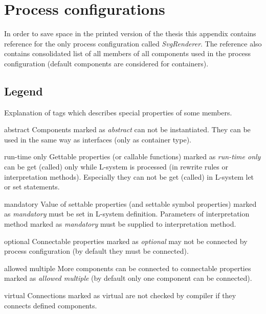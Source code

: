 
\chapter{Process configurations}
\label{chap:configurations}

In order to save space in the printed version of the thesis this appendix contains reference for the only process configuration called \emph{SvgRenderer}.
The reference also contains consolidated list of all members of all components used in the process configuration (default components are considered for containers).

\section{Legend}

Explanation of tags which describes special properties of some members.

\begin{description*}
	\item[abstract]
		Components marked as \emph{abstract} can not be instantiated.
		They can be used in the same way as interfaces (only as container type).
	\item[run-time only]
		Gettable properties (or callable functions) marked as \emph{run-time only} can be get (called) only while L-system is processed (in rewrite rules or interpretation methods).
		Especially they can not be get (called) in L-system let or set statements.
	\item[mandatory]
		Value of settable properties (and settable symbol properties) marked as \emph{mandatory} must be set in L-system definition.
		Parameters of interpretation method marked as \emph{mandatory} must be supplied to interpretation method.
	\item[optional]
		Connectable properties marked as \emph{optional} may not be connected by process configuration (by default they must be connected).
	\item[allowed multiple]
		More components can be connected to connectable properties marked as \emph{allowed multiple} (by default only one component can be connected).
	\item[virtual]
		Connections marked as virtual are not checked by compiler if they connects defined components.
\end{description*}




